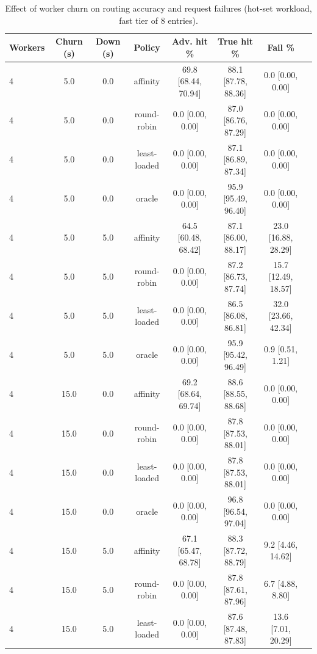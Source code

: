 \begin{table}[t]
\centering
\scriptsize
\setlength{\tabcolsep}{2.5pt}
\caption{Effect of worker churn on routing accuracy and request failures (hot-set workload, fast tier of 8 entries).}
\label{tab:churn}
\begin{tabular}{lccccccc}
\toprule
Workers & Churn (s) & Down (s) & Policy & Adv. hit \% & True hit \% & Fail \% \\
\midrule
4 & 5.0 & 0.0 & affinity & 69.8 \tiny [68.44, 70.94] & 88.1 \tiny [87.78, 88.36] & 0.0 \tiny [0.00, 0.00] \\
4 & 5.0 & 0.0 & round-robin & 0.0 \tiny [0.00, 0.00] & 87.0 \tiny [86.76, 87.29] & 0.0 \tiny [0.00, 0.00] \\
4 & 5.0 & 0.0 & least-loaded & 0.0 \tiny [0.00, 0.00] & 87.1 \tiny [86.89, 87.34] & 0.0 \tiny [0.00, 0.00] \\
4 & 5.0 & 0.0 & oracle & 0.0 \tiny [0.00, 0.00] & 95.9 \tiny [95.49, 96.40] & 0.0 \tiny [0.00, 0.00] \\
4 & 5.0 & 5.0 & affinity & 64.5 \tiny [60.48, 68.42] & 87.1 \tiny [86.00, 88.17] & 23.0 \tiny [16.88, 28.29] \\
4 & 5.0 & 5.0 & round-robin & 0.0 \tiny [0.00, 0.00] & 87.2 \tiny [86.73, 87.74] & 15.7 \tiny [12.49, 18.57] \\
4 & 5.0 & 5.0 & least-loaded & 0.0 \tiny [0.00, 0.00] & 86.5 \tiny [86.08, 86.81] & 32.0 \tiny [23.66, 42.34] \\
4 & 5.0 & 5.0 & oracle & 0.0 \tiny [0.00, 0.00] & 95.9 \tiny [95.42, 96.49] & 0.9 \tiny [0.51, 1.21] \\
4 & 15.0 & 0.0 & affinity & 69.2 \tiny [68.64, 69.74] & 88.6 \tiny [88.55, 88.68] & 0.0 \tiny [0.00, 0.00] \\
4 & 15.0 & 0.0 & round-robin & 0.0 \tiny [0.00, 0.00] & 87.8 \tiny [87.53, 88.01] & 0.0 \tiny [0.00, 0.00] \\
4 & 15.0 & 0.0 & least-loaded & 0.0 \tiny [0.00, 0.00] & 87.8 \tiny [87.53, 88.01] & 0.0 \tiny [0.00, 0.00] \\
4 & 15.0 & 0.0 & oracle & 0.0 \tiny [0.00, 0.00] & 96.8 \tiny [96.54, 97.04] & 0.0 \tiny [0.00, 0.00] \\
4 & 15.0 & 5.0 & affinity & 67.1 \tiny [65.47, 68.78] & 88.3 \tiny [87.72, 88.79] & 9.2 \tiny [4.46, 14.62] \\
4 & 15.0 & 5.0 & round-robin & 0.0 \tiny [0.00, 0.00] & 87.8 \tiny [87.61, 87.96] & 6.7 \tiny [4.88, 8.80] \\
4 & 15.0 & 5.0 & least-loaded & 0.0 \tiny [0.00, 0.00] & 87.6 \tiny [87.48, 87.83] & 13.6 \tiny [7.01, 20.29] \\

\end{tabular}
\end{table}
